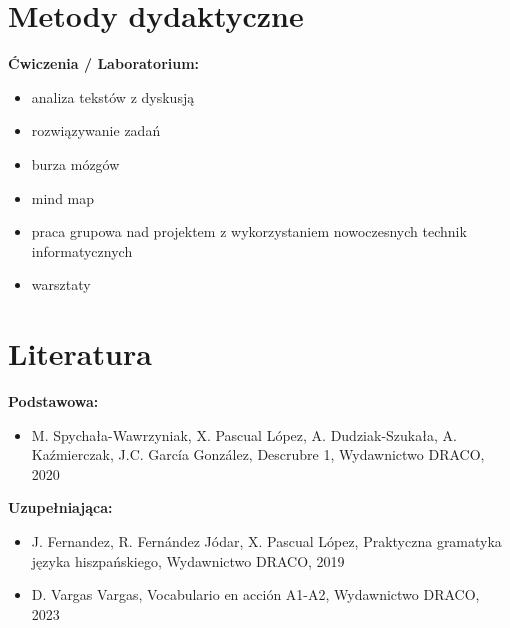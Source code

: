 \documentclass[12pt, a4paper]{article}
\begin{document}
\section{Metody dydaktyczne}

\textbf{Ćwiczenia / Laboratorium:}
\begin{itemize}
  \item analiza tekstów z dyskusją
  \item rozwiązywanie zadań
  \item burza mózgów
  \item mind map
  \item praca grupowa nad projektem z wykorzystaniem nowoczesnych technik informatycznych
  \item warsztaty
\end{itemize}
\vspace{4pt}


\section{Literatura}

\textbf{Podstawowa:}
\begin{itemize}
  \item M. Spychała-Wawrzyniak, X. Pascual López, A. Dudziak-Szukała, A. Kaźmierczak, J.C. García González, Descrubre 1, Wydawnictwo DRACO, 2020
\end{itemize}

\textbf{Uzupełniająca:}
\begin{itemize}
  \item J. Fernandez, R. Fernández Jódar, X. Pascual López, Praktyczna gramatyka języka hiszpańskiego, Wydawnictwo DRACO, 2019
  \item D. Vargas Vargas, Vocabulario en acción A1-A2, Wydawnictwo DRACO, 2023
\end{itemize}
\end{document}
